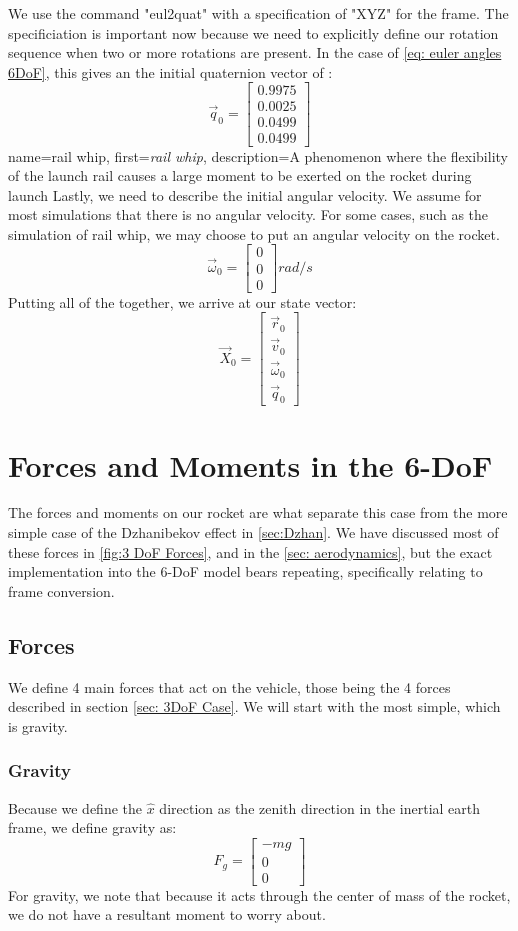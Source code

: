 \documentclass[12pt]{report}
\begin{document}
{We use the command "eul2quat" with a specification of "XYZ" for the frame. The specificiation is important now because we need to explicitly define our rotation sequence when two or more rotations are present. In the case of \eqref{eq: euler angles 6DoF}, this gives an the initial \gls{quaternion} vector of :
$$\vec{q}_0=\begin{bmatrix}
    0.9975\\0.0025\\0.0499\\0.0499
\end{bmatrix}$$
{
    name=rail whip,
    first={\textit{rail whip}},
    description={A phenomenon where the flexibility of the launch rail causes a large moment to be exerted on the rocket during launch}
}
Lastly, we need to describe the initial angular velocity. We assume for most simulations that there is no angular velocity. For some cases, such as the simulation of \gls{rail whip}, we may choose to put an angular velocity on the rocket.
$$\vec{\omega}_0=\begin{bmatrix}
0\\0\\0
\end{bmatrix} rad/s$$
Putting all of the together, we arrive at our \gls{state vector}:
$$\vec{X}_0=\begin{bmatrix}
    \vec{r}_0\\\vec{v}_0\\\vec{\omega}_0\\\vec{q}_0
\end{bmatrix}$$
\section{Forces and Moments in the 6-DoF}
The forces and moments on our rocket are what separate this case from the more simple case of the Dzhanibekov effect in \ref{sec:Dzhan}. We have discussed most of these forces in \ref{fig:3 DoF Forces}, and in the \ref{sec: aerodynamics}, but the exact implementation into the 6-DoF model bears repeating, specifically relating to frame conversion.
\subsection{Forces}\label{6DoF Forces}
We define 4 main forces that act on the vehicle, those being the 4 forces described in section \ref{sec: 3DoF Case}. We will start with the most simple, which is gravity.
\subsubsection{Gravity}
Because we define the $\hat{x}$ direction as the zenith direction in the inertial earth frame, we define gravity as:
\begin{equation}
   F_g= \begin{bmatrix}
    -mg\\0\\0
\end{bmatrix}
\end{equation}
For gravity, we note that because it acts through the center of mass of the rocket, we do not have a resultant moment to worry about.
}
\end{document}
